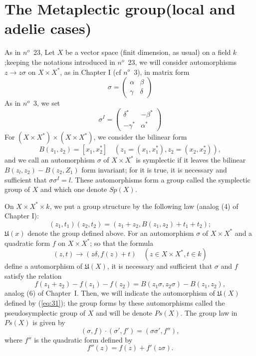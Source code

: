 \documentclass[12pt]{amsart}
\newcounter{ssection}
\renewcommand{\subsection}{
  \addtocounter{ssection}{1}{\bf  \arabic{ssection}.\  }}
\begin{document}
\section{The Metaplectic group(local and adelie cases)}
\setcounter{ssection}{30}
\subsection{}
 As in $n^o$~23, Let $X$ be a vector space (finit dimension, as usual) 
on a field $k$;keeping the notations introduced in $n^o$~23, we 
will consider automorphisms $z\to z\sigma$ on $X\times  X^*$,
as in Chapter I (cf $n^o$~3), in matrix form
\[
\sigma = \begin{pmatrix} \alpha & \beta\\ \gamma & \delta
\end{pmatrix}
\]
As in $n^o$~3, we set 
\[
\sigma^I = \begin{pmatrix} \delta^* & -\beta^* \\ -\gamma^* & \alpha^*
\end{pmatrix}
\]
For $(X\times X^*)\times (X\times X^*)$, we consider the bilinear form
\[
B(z_1,z_2) = [x_1,x_2^*] \quad (z_1 = (x_1,x_1^*), z_2=(x_2,x_2^*)),
\]
and we call an automorphism $\sigma$ of $X\times X^*$ is symplectic 
if it leaves the bilinear $B(z_l,z_2) - B(z_2,Z_1)$ form invariant; 
for it is true, it is necessary and sufficient that $\sigma \sigma^I=l$. 
These automorphisms form a group called the symplectic group of $X$ 
and which one denote $Sp(X)$.

On $X\times X^* \times k$, we put a group structure by the following law 
(analog (4) of Chapter I):
\begin{equation}\label{eq:30}
(z_1,t_1)(z_2,t_2)=(z_1+z_2,B(z_1,z_2)+t_1+t_2);
\end{equation}
\def\fU{{\mathfrak{U}}}
$\fU(x)$ denote the group defined above.
For an automorphism $\sigma$ of $X \times X^*$ and a quadratic form $f$ 
on $X \times X^*$; so that the formula
\begin{equation}\label{eq:31}
(z,t) \to (z\delta, f(z)+t) \quad (z\in X\times X^*, t\in k)
\end{equation}
define a automorphism of $\fU(X)$, it is necessary and sufficient that $\sigma$ and $f$ 
satisfy the relation
\begin{equation}\label{eq:32}
f(z_1+z_2)-f(z_1)-f(z_2) = B(z_1\sigma, z_2\sigma)-B(z_1,z_2),
\end{equation}
analog (6) of Chapter~I.
Then, we will indicate the automorphism 
of $\fU(X)$ defined by (\ref{eq:31});   
the group forms by these automorphisms called the  
pseudosymplectic group of $X$ and will be denote $Ps(X)$.  
The group law in $Ps(X)$ is given by 
\[
(\sigma,f)\cdot (\sigma',f') = (\sigma\sigma',f''), 
\]
where $f''$ is the quadratic form defined by 
\[
f''(z) =f(z)+f'(z\sigma).
\]
\end{document}
